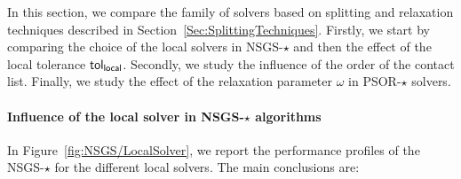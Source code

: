 In this section, we compare the family of solvers based on splitting and relaxation techniques described in Section~\ref{Sec:SplittingTechniques}. Firstly, we start by comparing the choice of the local solvers in {\sf NSGS-$\star$} and then the effect of the local tolerance $\sf tol_{local}$. Secondly, we study the influence of the order  of the contact list. Finally, we study the effect of the relaxation parameter $\omega$ in  {\sf PSOR-$\star$} solvers. 

\paragraph{Influence of the local solver in {\sf NSGS-$\star$}  algorithms} In Figure~\ref{fig:NSGS/LocalSolver}, we report the performance profiles of the  {\sf NSGS-$\star$} for the different local solvers.  The main conclusions are:
